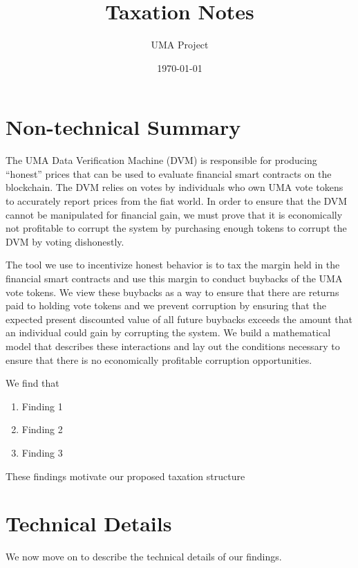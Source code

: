\documentclass[12pt]{article}
\title{Taxation Notes}
\author{UMA Project}
\date{\today}
\begin{document}
\maketitle

\clearpage
\newpage


\section{Non-technical Summary}

  The UMA Data Verification Machine (DVM) is responsible for producing ``honest'' prices that can be
  used to evaluate financial smart contracts on the blockchain. The DVM relies on votes by
  individuals who own UMA vote tokens to accurately report prices from the fiat world. In order to
  ensure that the DVM cannot be manipulated for financial gain, we must prove that it is
  economically not profitable to corrupt the system by purchasing enough tokens to corrupt the DVM
  by voting dishonestly.

  The tool we use to incentivize honest behavior is to tax the margin held in the financial smart
  contracts and use this margin to conduct buybacks of the UMA vote tokens. We view these buybacks
  as a way to ensure that there are returns paid to holding vote tokens and we prevent corruption
  by ensuring that the expected present discounted value of all future buybacks exceeds the amount
  that an individual could gain by corrupting the system. We build a mathematical model that
  describes these interactions and lay out the conditions necessary to ensure that there is no
  economically profitable corruption opportunities.

  We find that

  \begin{enumerate}
    \item Finding 1
    \item Finding 2
    \item Finding 3
  \end{enumerate}

  These findings motivate our proposed taxation structure

  \clearpage
  \newpage

\section{Technical Details}

  We now move on to describe the technical details of our findings.
\end{document}
